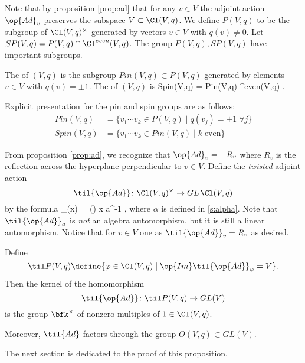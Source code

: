 \documentclass[../main.tex]{subfiles}
\begin{document}
\subsection{}

Note that by proposition \ref{prop:ad} that for any $v \in V$ the adjoint action $\op{Ad}_v$ preserves the subspace $V \subset \Cl(V,q)$.
We define $P(V,q)$ to be the subgroup of $\Cl(V,q)^\times$ generated by vectors $v \in V$ with $q(v) \ne 0$.
Let $SP(V,q) = P(V,q)\cap \Cl^{even}(V,q)$.
The group $P(V,q),SP(V,q)$ have important subgroups.

\begin{dfn}
The  of $(V,q)$ is the subgroup $Pin(V,q) \subset P(V,q)$ generated by elements $v \in V$ with $q(v) = \pm 1$.
The  of $(V,q)$ is
\beqn
Spin(V,q) = Pin(V,q) \cap \Cl^{even}(V,q) .
\eeqn
\end{dfn}

Explicit presentation for the pin and spin groups are as follows:
\begin{align*}
Pin(V,q) & = \{v_1 \cdots v_k \in P(V,q) \; | \; q(v_j) = \pm 1 \; \forall j\} \\
Spin(V,q) & = \{v_1 \cdots v_k \in Pin(V,q) \; | \; k \; \text{even}\}
\end{align*}

From proposition \ref{prop:ad}, we recognize that $\op{Ad}_v = - R_v$ where $R_v$ is the reflection across the hyperplane perpendicular to $v \in V$.
Define the \textit{twisted} adjoint action 
\[
\til{\op{Ad}} \colon \Cl(V,q)^\times \to GL \,  \Cl(V,q)
\]
by the formula
\beqn
{}_\varphi (x) = \alpha(\varphi) x a^{-1} ,
\eeqn
where $\alpha$ is defined in \ref{s:alpha}.
Note that $\til{\op{Ad}}_a$ is \textit{not} an algebra automorphism, but it is still a linear automorphism.
Notice that for $v \in V$ one as $\til{\op{Ad}}_v = R_v$ as desired.

\begin{prop}\label{prop:tech}
Define
\[
\til P (V,q) \define \{\varphi \in \Cl(V,q) \; | \; \op{Im} \til{\op{Ad}}_\varphi = V \} .
\]
Then the kernel of the homomorphism
\[
\til{\op{Ad}} \colon \til P(V,q) \to GL(V)
\]
is the group $\bfk^\times$ of nonzero multiples of $1 \in \Cl(V,q)$.

Moreover, $\til{Ad}$ factors through the group $O(V,q) \subset GL(V)$.
\end{prop}

The next section is dedicated to the proof of this proposition.
\end{document}
